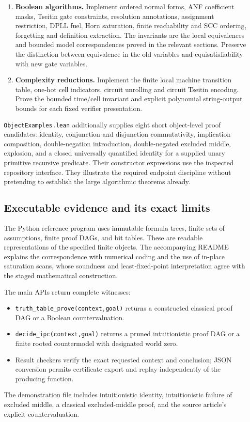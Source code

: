 \begin{enumerate}
generated cones and two-model gluing and verify the Harrop induction.
\item \textbf{Boolean algorithms.} Implement ordered normal forms,
ANF coefficient masks, Tseitin gate constraints, resolution annotations,
assignment restriction, DPLL fuel, Horn saturation, finite reachability
and SCC ordering, forgetting and definition extraction. The invariants
are the local equivalences and bounded model correspondences proved in
the relevant sections. Preserve the distinction between equivalence in
the old variables and equisatisfiability with new gate variables.
\item \textbf{Complexity reductions.} Implement the finite local machine
transition table, one-hot cell indicators, circuit unrolling and circuit
Tseitin encoding. Prove the bounded time/cell invariant and explicit
polynomial string-output bounds for each fixed verifier presentation.
\end{enumerate}

\texttt{ObjectExamples.lean} additionally supplies eight short object-level
proof candidates: identity, conjunction and disjunction commutativity,
implication composition, double-negation introduction, double-negated
excluded middle, explosion, and a closed universally quantified identity
for a supplied unary primitive recursive predicate. Their constructor
expressions use the inspected repository interface. They illustrate the
required endpoint discipline without pretending to establish the large
algorithmic theorems already.

\subsection{Executable evidence and its exact limits}

The Python reference program uses immutable formula trees, finite sets
of assumptions, finite proof DAGs, and bit tables. These are readable
representations of the specified finite objects. The accompanying README
explains the correspondence with numerical coding and the use of in-place
saturation scans, whose soundness and least-fixed-point interpretation
agree with the staged mathematical construction.

The main APIs return complete witnesses:
\begin{itemize}
\item \texttt{truth\_table\_prove(context,goal)} returns a constructed
classical proof DAG or a Boolean countervaluation.
\item \texttt{decide\_ipc(context,goal)} returns a pruned intuitionistic
proof DAG or a finite rooted countermodel with designated world zero.
\item Result checkers verify the exact requested context and conclusion;
JSON conversion permits certificate export and replay independently of
the producing function.
\end{itemize}
The demonstration file includes intuitionistic identity, intuitionistic
failure of excluded middle, a classical excluded-middle proof, and the
source article's explicit countervaluation.

